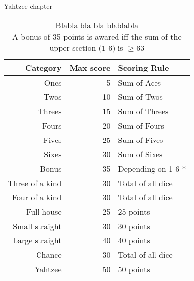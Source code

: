 Yahtzee chapter


\begin{table}
\centering
\begin{tabular}{|r|r|l|}
\hline
\textbf{Category} & \textbf{Max score} & \textbf{Scoring Rule} \\ \hline
Ones				&  5 & Sum of Aces 			\\ \hline
Twos				& 10 & Sum of Twos 			\\ \hline
Threes				& 15 & Sum of Threes 		\\ \hline
Fours				& 20 & Sum of Fours 		\\ \hline
Fives				& 25 & Sum of Fives 		\\ \hline
Sixes				& 30 & Sum of Sixes 		\\ \Xhline{3\arrayrulewidth}
Bonus				& 35 & Depending on 1-6 *	\\ \Xhline{3\arrayrulewidth}
Three of a kind		& 30 & Total of all dice 	\\ \hline
Four of a kind		& 30 & Total of all dice 	\\ \hline
Full house			& 25 & 25 points 			\\ \hline
Small straight		& 30 & 30 points 			\\ \hline
Large straight		& 40 & 40 points 			\\ \hline	
Chance				& 30 & Total of all dice 	\\ \hline	
Yahtzee				& 50 & 50 points 			\\ \hline	
\end{tabular}
\caption{Blabla bla bla blablabla \\
\textasteriskcentered A bonus of 35 points is awared iff the sum of the upper section (1-6) is $\ge 63$}
	\label{tab:rollout_cap_results}
\end{table}

